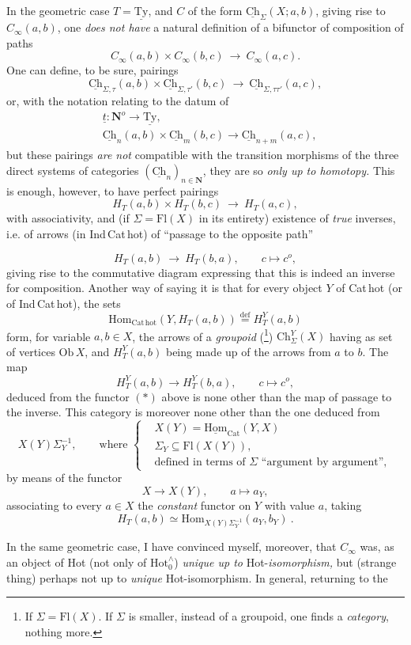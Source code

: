 \documentclass[11pt]{article}
\newcommand{\printedpage}[1]{\marginpar{\footnotesize p.~#1}}
\newcommand{\msp}[1]{\marginpar{\footnotesize [#1]}}
\newcommand{\Hotz}{\mathrm{Hot}^{\wedge}_{0}}
\newcommand{\Ch}{\underline{\mathrm{Ch}}}
\newcommand{\Ty}{\underline{\mathrm{Ty}}}
\begin{document}
\msp{page 115}
In the geometric case $T = \Ty$, and $C$ of the form $\Ch_{\Sigma}(X;a,b)$, giving rise to $C_{\infty}(a,b)$, one \textit{does not have} a natural definition of a bifunctor of composition of paths
\[
C_{\infty}(a,b) \times C_{\infty}(b,c) \ \longrightarrow\ C_{\infty}(a,c).
\]
One can define, to be sure, pairings
\[
\Ch_{\Sigma,\tau}(a,b) \times \Ch_{\Sigma,\tau'}(b,c) \ \longrightarrow\ \Ch_{\Sigma,\tau\tau'}(a,c),
\]
or, with the notation relating to the datum of
\[
\begin{aligned}
&\underline{t} : \mathbf{N}^{o} \longrightarrow \Ty,\\
&\Ch_{n}(a,b) \times \Ch_{m}(b,c) \longrightarrow \Ch_{n+m}(a,c),
\end{aligned}
\]
\printedpage{73}
but these pairings \textit{are not} compatible with the transition morphisms of the three direct systems of categories $(\Ch_{n})_{n\in\mathbf{N}}$, they are so \textit{only up to homotopy.} This is enough, however, to have perfect pairings
\[
H_{T}(a,b) \times H_{T}(b,c) \ \longrightarrow\ H_{T}(a,c),
\]
with associativity, and (if $\Sigma = \mathrm{Fl}(X)$ in its entirety) existence of \textit{true} inverses, i.e. of arrows (in Ind\,Cat\,hot) of ``passage to the opposite path''

\msp{page 116}
\[
H_{T}(a,b) \ \longrightarrow\ H_{T}(b,a), \qquad c \longmapsto c^{o}, \tag*{$(*)$}
\]
giving rise to the commutative diagram expressing that this is indeed an inverse for composition. Another way of saying it is that for every object $Y$ of Cat\,hot (or of Ind\,Cat\,hot), the sets
\[
\mathrm{Hom}_{\mathrm{Cat\,hot}}(Y, H_{T}(a,b)) \overset{\text{def}}{=} H_{T}^{Y}(a,b)
\]
form, for variable $a,b \in X$, the arrows of a \textit{groupoid} (\footnote[25]{If $\Sigma = \mathrm{Fl}(X)$. If $\Sigma$ is smaller, instead of a groupoid, one finds a \textit{category}, nothing more.}) $\mathrm{Ch}_{\Sigma}^{Y}(X)$ having as set of vertices $\mathrm{Ob}\,X$, and $H_{T}^{Y}(a,b)$ being made up of the arrows from $a$ to $b$. The map
\[
H_{T}^{Y}(a,b) \longrightarrow H_{T}^{Y}(b,a), \qquad c \longmapsto c^{o},
\]
deduced from the functor $(*)$ above is none other than the map of passage to the inverse. This category is moreover none other than the one deduced from %
\[
X(Y)\Sigma_{Y}^{-1}, \qquad \text{where } \left\{
\begin{aligned}
&X(Y) = \underline{\mathrm{Hom}}_{\mathrm{Cat}}(Y,X)\\
&\Sigma_{Y} \subseteq \mathrm{Fl}(X(Y)),\\
&\text{defined in terms of } \Sigma \text{ ``argument by argument''},
\end{aligned}
\right.
\]
by means of the functor
\[
X \longrightarrow X(Y), \qquad a \longmapsto a_{Y},
\]
\msp{page 117}
associating to every $a \in X$ the \textit{constant} functor on $Y$ with value $a$, taking
\[
H_{T}(a,b) \simeq \mathrm{Hom}_{X(Y)\Sigma_{Y}^{-1}}(a_{Y}, b_{Y}) \ .
\]

In the same geometric case, I have convinced myself, moreover, that $C_{\infty}$ was, as an object of Hot (not only of $\Hotz$) \textit{unique up to} Hot-\textit{isomorphism,} but (strange thing) perhaps not up to \textit{unique} Hot-isomorphism. In general, returning to the
\end{document}
